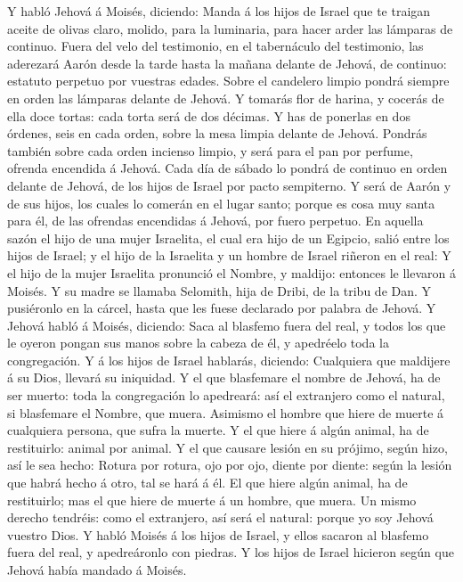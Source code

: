  Y habló Jehová á Moisés, diciendo:  Manda á
los hijos de Israel que te traigan aceite de olivas claro, molido, para
la luminaria, para hacer arder las lámparas de continuo. 
Fuera del velo del testimonio, en el tabernáculo del testimonio, las
aderezará Aarón desde la tarde hasta la mañana delante de Jehová, de
continuo: estatuto perpetuo por vuestras edades.  Sobre el
candelero limpio pondrá siempre en orden las lámparas delante de Jehová.
 Y tomarás flor de harina, y cocerás de ella doce tortas:
cada torta será de dos décimas.  Y has de ponerlas en dos
órdenes, seis en cada orden, sobre la mesa limpia delante de Jehová.
 Pondrás también sobre cada orden incienso limpio, y será
para el pan por perfume, ofrenda encendida á Jehová.  Cada
día de sábado lo pondrá de continuo en orden delante de Jehová, de los
hijos de Israel por pacto sempiterno.  Y será de Aarón y
de sus hijos, los cuales lo comerán en el lugar santo; porque es cosa
muy santa para él, de las ofrendas encendidas á Jehová, por fuero
perpetuo.  En aquella sazón el hijo de una mujer
Israelita, el cual era hijo de un Egipcio, salió entre los hijos de
Israel; y el hijo de la Israelita y un hombre de Israel riñeron en el
real:  Y el hijo de la mujer Israelita pronunció el
Nombre, y maldijo: entonces le llevaron á Moisés. Y su madre se llamaba
Selomith, hija de Dribi, de la tribu de Dan.  Y
pusiéronlo en la cárcel, hasta que les fuese declarado por palabra de
Jehová.  Y Jehová habló á Moisés, diciendo:
 Saca al blasfemo fuera del real, y todos los que le
oyeron pongan sus manos sobre la cabeza de él, y apedréelo toda la
congregación.  Y á los hijos de Israel hablarás,
diciendo: Cualquiera que maldijere á su Dios, llevará su iniquidad.
 Y el que blasfemare el nombre de Jehová, ha de ser
muerto: toda la congregación lo apedreará: así el extranjero como el
natural, si blasfemare el Nombre, que muera.  Asimismo el
hombre que hiere de muerte á cualquiera persona, que sufra la muerte.
 Y el que hiere á algún animal, ha de restituirlo: animal
por animal.  Y el que causare lesión en su prójimo, según
hizo, así le sea hecho:  Rotura por rotura, ojo por ojo,
diente por diente: según la lesión que habrá hecho á otro, tal se hará á
él.  El que hiere algún animal, ha de restituirlo; mas el
que hiere de muerte á un hombre, que muera.  Un mismo
derecho tendréis: como el extranjero, así será el natural: porque yo soy
Jehová vuestro Dios.  Y habló Moisés á los hijos de
Israel, y ellos sacaron al blasfemo fuera del real, y apedreáronlo con
piedras. Y los hijos de Israel hicieron según que Jehová había mandado á
Moisés.

